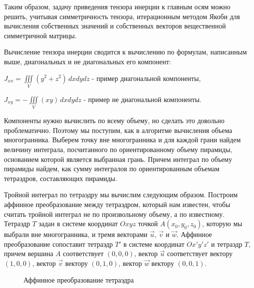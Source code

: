 \documentclass[a4paper,12pt, titlepage]{article}
\begin{document}
Таким образом, задачу приведения тензора инерции к главным осям можно решить, учитывая симметричность тензора, итерационным 
методом Якоби для вычисления собственных значений и собственных векторов вещественной симметричной матрицы.

Вычисление тензора инерции сводится к вычислению по формулам, написанным выше, диагональных и не диагональных его компонент:
\begin{center}
$J_{xx} = \iiint \limits_V (y^2 +  z^{2})\,dxdydz$ - пример диагональной компоненты,

$J_{xy} = - \iiint \limits_V (xy)\,dxdydz$ - пример не диагональной компоненты.
\end{center}

Компоненты нужно вычислить по всему объему, но сделать это довольно проблематично. Поэтому мы поступим, как в алгоритме 
вычисления объема многогранника. Выберем точку вне многогранника и для каждой грани найдем величину интеграла, посчитанного
по ориентированному объему пирамиды, основанием которой является выбранная грань. Причем интеграл по объему пирамиды найдем,
как сумму интегралов по ориентированным объемам тетраэдров, составляющих пирамиды. 

Тройной интеграл по тетраэдру мы вычислим следующим образом. Построим аффинное преобразование между тетраэдром, 
который нам известен, чтобы считать тройной интеграл не по произвольному объему, а по известному. Тетраэдр $T$ задан в
системе координат $Oxyz$ точкой $A({x}_{0},{y}_{0},{z}_{0})$, которую мы выбрали вне многогранника, и 
тремя векторами $\vec u$, $\vec v$ и $\vec w$. 
Аффинное преобразование сопоставит тетраэдр $T'$ в системе координат $Ox'y'z'$ и тетраэдр $T$,
причем вершина $A$ соответствует $(0,0,0)$, вектор $\vec u$ соответствует вектору $(1,0,0)$, 
вектор $\vec v$ вектору $(0,1,0)$, вектор $\vec w$ вектору $(0,0,1)$.  

\begin{figure}[h]
\noindent{}
\caption{Аффинное преобразование тетраэдра}
\label{taff}
\end{figure}
\newpage
\end{document}
